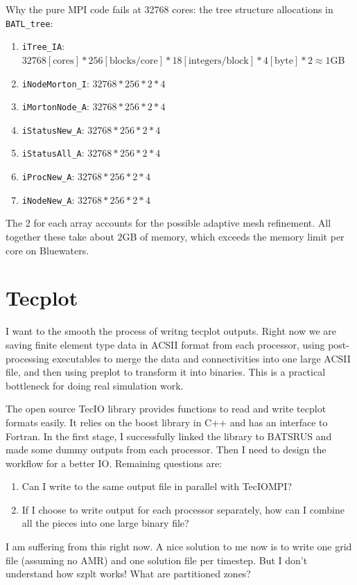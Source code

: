 \documentclass[11pt]{book} %
\begin{document}
Why the pure MPI code fails at 32768 cores: the tree structure allocations in \verb|BATL_tree|:
\begin{enumerate}
\item \verb|iTree_IA|: $32768 [\text{cores}] * 256 [\text{blocks/core}]*18 [\text{integers/block}] * 4 [\text{byte}] *2\approx 1$GB
\item \verb|iNodeMorton_I|: $32768*256*2*4$
\item \verb|iMortonNode_A|: $32768*256*2*4$
\item \verb|iStatusNew_A|: $32768*256*2*4$
\item \verb|iStatusAll_A|: $32768*256*2*4$
\item \verb|iProcNew_A|: $32768*256*2*4$
\item \verb|iNodeNew_A|: $32768*256*2*4$
\end{enumerate}

The 2 for each array accounts for the possible adaptive mesh refinement.
All together these take about $2$GB of memory, which exceeds the memory limit per core on Bluewaters.

\section{Tecplot}

I want to the smooth the process of writng tecplot outputs. Right now we are saving finite element type data in ACSII format from each processor, using post-processing executables to merge the data and connectivities into one large ACSII file, and then using preplot to transform it into binaries. This is a practical bottleneck for doing real simulation work.

The open source TecIO library provides functions to read and write tecplot formats easily. It relies on the boost library in C++ and has an interface to Fortran. In the first stage, I successfully linked the library to BATSRUS and made some dummy outputs from each processor. Then I need to design the workflow for a better IO. Remaining questions are:
\begin{enumerate}
\item Can I write to the same output file in parallel with TecIOMPI?
\item If I choose to write output for each processor separately, how can I combine all the pieces into one large binary file?
\end{enumerate}

I am suffering from this right now. A nice solution to me now is to write one grid file (assuming no AMR) and one solution file per timestep. But I don't understand how szplt works! What are partitioned zones?
\end{document}
